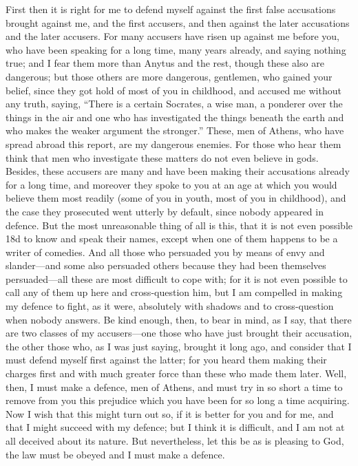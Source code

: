 First then it is right for me to defend myself against the first false accusations brought against me, and the first accusers, and then against the later accusations and the later accusers.  For many accusers have risen up against me before you, who have been speaking for a long time, many years already, and saying nothing true; and I fear them more than Anytus and the rest, though these also are dangerous; but those others are more dangerous, gentlemen, who gained your belief, since they got hold of most of you in childhood, and accused me without any truth, saying, “There is a certain Socrates, a wise man, a ponderer over the things in the air and one who has investigated the things beneath the earth and who makes the weaker argument the stronger.” These, men of Athens,  who have spread abroad this report, are my dangerous enemies. For those who hear them think that men who investigate these matters do not even believe in gods. Besides, these accusers are many and have been making their accusations already for a long time, and moreover they spoke to you at an age at which you would believe them most readily (some of you in youth, most of you in childhood), and the case they prosecuted went utterly by default, since nobody appeared in defence. But the most unreasonable thing of all is this, that it is not even possible {18d} to know and speak their names, except when one of them happens to be a writer of comedies. And all those who persuaded you by means of envy and slander—and some also persuaded others because they had been themselves persuaded—all these are most difficult to cope with; for it is not even possible to call any of them up here and cross-question him, but I am compelled in making my defence to fight, as it were, absolutely with shadows and to cross-question when nobody answers. Be kind enough, then, to bear in mind, as I say, that there are two classes  of my accusers—one those who have just brought their accusation, the other those who, as I was just saying, brought it long ago, and consider that I must defend myself first against the latter; for you heard them making their charges first and with much greater force than these who made them later. Well, then, I must make a defence, men of Athens,  and must try in so short a time to remove from you this prejudice which you have been for so long a time acquiring. Now I wish that this might turn out so, if it is better for you and for me, and that I might succeed with my defence; but I think it is difficult, and I am not at all deceived about its nature. But nevertheless, let this be as is pleasing to God, the law must be obeyed and I must make a defence.

